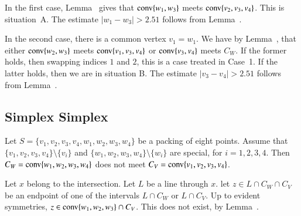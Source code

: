 \begin{tarskidata}
\begin{tarski}
\begin{proved}
In the first case, Lemma~ gives that ${\operatorname{conv}}\{w_1,w_3\}$
meets ${\operatorname{conv}}\{v_2,v_3,v_4\}$.  This is situation~A.  The estimate
$|w_1-w_3|>2.51$ follows from Lemma~.\FIXX{$\CalE$}

In the second case, there is a common vertex $v_1=w_1$.  We have
by Lemma~, that either ${\operatorname{conv}}\{w_2,w_3\}$ meets
${\operatorname{conv}}\{v_1,v_3,v_4\}$ or ${\operatorname{conv}}\{v_3,v_4\}$ meets
$C_W$.  If the former holds, then swapping indices $1$ and $2$,
this is a case treated in Case~1.  If the latter holds, then
we are in situation B.  The estimate $|v_3-v_4|>2.51$ follows
from Lemma~.\FIXX{$\CalE$}
\swallowed\end{proved}
\end{tarski}







\begin{tarski}
\section{Simplex Simplex}

\begin{lemma}
Let $S=\{v_1,v_2,v_3,v_4,w_1,w_2,w_3,w_4\}$ be a packing of eight
points.
Assume that $\{v_1,v_2,v_3,v_4\}\setminus\{v_i\}$ and
$\{w_1,w_2,w_3,w_4\}\setminus\{w_i\}$ are special, for $i=1,2,3,4$.
Then $C_W ={\operatorname{conv}}\{w_1,w_2,w_3,w_4\}$ does not meet
$C_V = {\operatorname{conv}}\{v_1,v_2,v_3,v_4\}$.
\end{lemma}

\begin{proved}
Let $x$ belong to the intersection.  Let $L$ be a line through
$x$.  let $z\in L\cap C_W\cap C_V$ be an endpoint of one of the
intervals $L\cap C_W$ or $L\cap C_V$.  Up to evident symmetries,
$z\in {\operatorname{conv}}\{w_1,w_2,w_3\}\cap C_V$.  This does not exist,
by Lemma~.
\swallowed\end{proved}
\end{tarski}





\begin{tarski}


\end{tarski}
\end{tarskidata}

